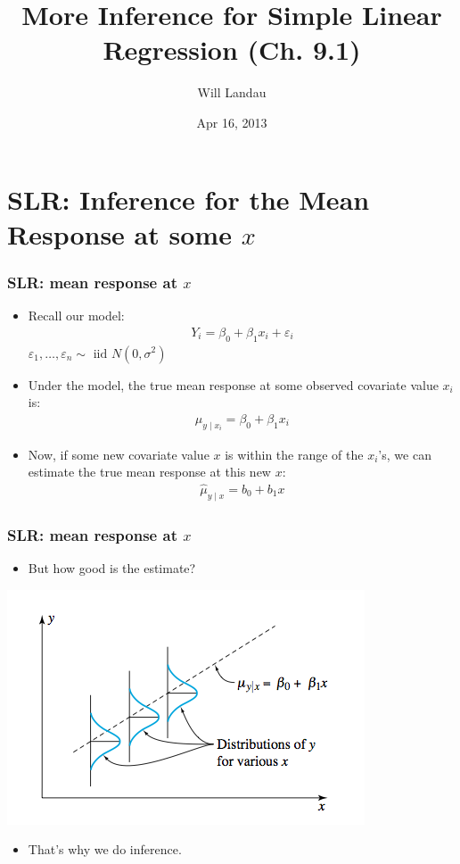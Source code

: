 \documentclass[handout]{beamer}\usepackage{graphicx, color}
\title{More Inference for Simple Linear Regression (Ch. 9.1)}
\author{Will Landau}
\date{Apr 16, 2013}
\institute{Iowa State University}
\providecommand{\e}{\varepsilon}
\providecommand{\wh}[1]{\widehat{#1}}
\numberwithin{equation}{section}
\begin{document}
\begin{frame}
\titlepage
 \end{frame}
 

\section{SLR: Inference for the Mean Response at some $x$}

\begin{frame}
\frametitle{SLR: mean response at $x$}
\begin{itemize}
\item Recall our model:
\begin{align*}
Y_i = \beta_0 + \beta_1 x_i + \e_i
\end{align*}
$\e_1, \ldots, \e_n \sim \text{ iid } N(0, \sigma^2)$
\pause \item Under the model, the true mean response at some observed covariate value $x_i$ is:
\begin{align*}
\mu_{y \mid x_i} = \beta_0 + \beta_1 x_i
\end{align*}
\pause \item Now, if some new covariate value $x$ is within the range of the $x_i$'s, we can estimate the true mean response at this new $x$:
\begin{align*}
\wh{\mu}_{y \mid x} = b_0 + b_1 x
\end{align*}
\end{itemize}
\end{frame}


\begin{frame}
\frametitle{SLR: mean response at $x$}
\begin{itemize}
\item But how good is the estimate?
\end{itemize}
 \includegraphics{../../fig/normalsimplereg.png}
\begin{itemize}
\item That's why we do inference.
\end{itemize}
\end{frame}
\end{document}
